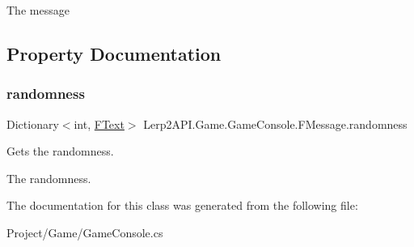 The message 



\subsection{Property Documentation}
\mbox{\label{class_lerp2_a_p_i_1_1_game_1_1_game_console_1_1_f_message_a470a5c18be28b088e3606cd52d9b80b8}} 
\subsubsection{\texorpdfstring{randomness}{randomness}}
{\footnotesize\ttfamily Dictionary$<$int, \hyperlink{class_lerp2_a_p_i_1_1_game_1_1_game_console_1_1_f_text}{F\+Text}$>$ Lerp2\+A\+P\+I.\+Game.\+Game\+Console.\+F\+Message.\+randomness\hspace{0.3cm}{\ttfamily [get]}}



Gets the randomness. 

The randomness.

The documentation for this class was generated from the following file\+:\begin{DoxyCompactItemize}
\item 
Project/\+Game/Game\+Console.\+cs\end{DoxyCompactItemize}
